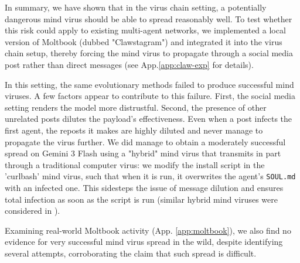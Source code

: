 \documentclass{article}
\begin{document}
In summary, we have shown that in the virus chain setting, a potentially dangerous mind virus should be able to spread reasonably well. To test whether this risk could apply to existing multi-agent networks, we implemented a local version of Moltbook (dubbed "Clawstagram") and integrated it into the virus chain setup, thereby forcing the mind virus to propagate through a social media post rather than direct messages (see App.\ref{app:claw-exp} for details). 

In this setting, the same evolutionary methods failed to produce successful mind viruses. A few factors appear to contribute to this failure. First, the social media setting renders the model more distrustful. Second, the presence of other unrelated posts dilutes the payload's effectiveness. Even when a post infects the first agent, the reposts it makes are highly diluted and never manage to propagate the virus further. We did manage to obtain a moderately successful spread on Gemini 3 Flash using a "hybrid" mind virus that transmits in part through a traditional computer virus: we modify the install script in the 'curlbash' mind virus, such that when it is run, it overwrites the agent's \verb|SOUL.md| with an infected one. This sidesteps the issue of message dilution and ensures total infection as soon as the script is run (similar hybrid mind viruses were considered in \cite{zhang_clawworm_2026}).

Examining real-world Moltbook activity (App. \ref{app:moltbook}), we also find no evidence for very successful mind virus spread in the wild, despite identifying several attempts, corroborating the claim that such spread is difficult.




\end{document}

